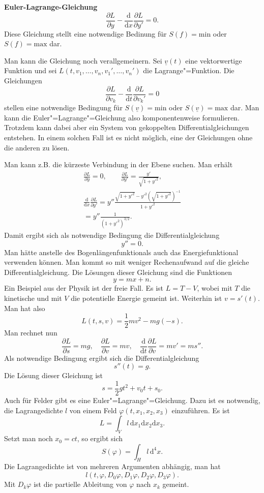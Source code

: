 \documentclass[a4paper,10pt,fleqn,twocolumn,twoside]{article}
\begin{document}
\textbf{Euler-Lagrange-Gleichung}
\[\frac{\partial L}{\partial y}
-\frac{\mathrm d}{\mathrm dx}\frac{\partial L}{\partial y'}
=0.\]
Diese Gleichung stellt eine notwendige Bedinung für \(S(f)=\mathrm{min}\) oder
\(S(f)=\mathrm{max}\) dar.

Man kann die Gleichung noch verallgemeinern. Sei \(\underline v(t)\)
eine vektorwertige Funktion und sei
\(L(t,v_1,\ldots,v_n,v_1',\ldots,v_n')\) die Lagrange"=Funktion.
Die Gleichungen
\[\frac{\partial L}{\partial v_k}
-\frac{\mathrm d}{\mathrm dt}\frac{\partial L}{\partial v_k'}
=0\]
stellen eine notwendige Bedingung für
\(S(\underline v)=\mathrm{min}\) oder
\(S(\underline v)=\mathrm{max}\) dar.
Man kann die Euler"=Lagrange"=Gleichung also komponentenweise
formulieren. Trotzdem kann dabei aber ein System von gekoppelten
Differentialgleichungen entstehen. In einem solchen Fall ist es
nicht möglich, eine der Gleichungen ohne die anderen zu lösen.

Man kann z.B. die kürzeste Verbindung in der Ebene suchen. Man erhält
\begin{gather*}
\frac{\partial L}{\partial y} = 0,\qquad
\frac{\partial L}{\partial y'} = \frac{y'}{\sqrt{1+y'^2}},\\
\frac{\mathrm d}{\mathrm dx}\frac{\partial L}{\partial y'}
= y''\frac{\sqrt{1+y'^2}-y'^2(\sqrt{1+y'^2})^{-1}}{1+y'^2}\\
= y''\frac{1}{(1+y'^2)^{3/2}}.
\end{gather*}
Damit ergibt sich als notwendige Bedingung die Differentialgleichung
\[y''=0.\]
Man hätte anstelle des Bogenlängenfunktionals auch das
Energiefunktional verwenden können. Man kommt so mit weniger
Rechenaufwand auf die gleiche Differentialgleichung.
Die Lösungen dieser Gleichung sind die Funktionen
\[y=mx+n.\]
Ein Beispiel aus der Physik ist der freie Fall. Es ist \(L=T-V\),
wobei mit \(T\) die kinetische und mit \(V\) die potentielle Energie
gemeint ist. Weiterhin ist \(v=s'(t)\). Man hat also
\[L(t,s,v) = \frac{1}{2}mv^2 - mg(-s).\]
Man rechnet nun
\[
\frac{\partial L}{\partial s} = mg,\quad
\frac{\partial L}{\partial v} = mv,\quad
\frac{\mathrm d}{\mathrm dt}\frac{\partial L}{\partial v}
= mv' = ms''.
\]
Als notwendige Bedingung ergibt sich die Differentialgleichung
\[s''(t) = g.\]
Die Lösung dieser Gleichung ist
\[s=\frac{1}{2}gt^2+v_0t+s_0.\]
%
Auch für Felder gibt es eine Euler"=Lagrange"=Gleichung. Dazu ist es
notwendig, die Lagrangedichte \(l\) von einem Feld
\(\varphi(t,x_1,x_2,x_3)\) einzuführen. Es ist
\[L = \int_V l\,\mathrm dx_1\mathrm dx_2\mathrm dx_3.\]
Setzt man noch \(x_0=ct\), so ergibt sich
\[S(\varphi) = \int_H l\,\mathrm d^4x.\]
Die Lagrangedichte ist von mehreren Argumenten abhängig, man hat
\[l(t,\varphi,D_0\varphi, D_1\varphi, D_2\varphi, D_3\varphi).\]
Mit \(D_k\varphi\) ist die partielle Ableitung von \(\varphi\) nach \(x_k\) gemeint.
\end{document}
